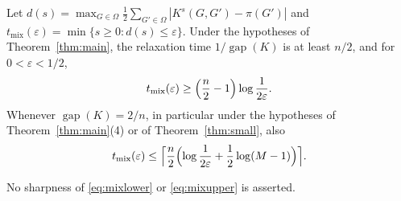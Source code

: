 \begin{corollary}\label{cor:mixing}
Let $d(s)=\max_{G\in\Omega}\frac12\sum_{G'\in\Omega}|K^s(G,G')-\pi(G')|$ and
$t_{\mathrm{mix}}(\varepsilon)=\min\{s\ge0:d(s)\le\varepsilon\}$. Under the
hypotheses of Theorem~\ref{thm:main}, the relaxation time
$1/\operatorname{gap}(K)$ is at least $n/2$, and for $0<\varepsilon<1/2$,
\begin{equation}\label{eq:mixlower}
 t_{\mathrm{mix}}(\varepsilon)\ge\Bigl(\frac n2-1\Bigr)\log\frac1{2\varepsilon}.
\end{equation}
Whenever $\operatorname{gap}(K)=2/n$, in particular under the hypotheses of
Theorem~\ref{thm:main}(4) or of Theorem~\ref{thm:small}, also
\begin{equation}\label{eq:mixupper}
 t_{\mathrm{mix}}(\varepsilon)\le\Bigl\lceil\frac n2
 \Bigl(\log\frac1{2\varepsilon}+\frac12\log(M-1)\Bigr)\Bigr\rceil .
\end{equation}
\end{corollary}

No sharpness of \eqref{eq:mixlower} or \eqref{eq:mixupper} is asserted.

